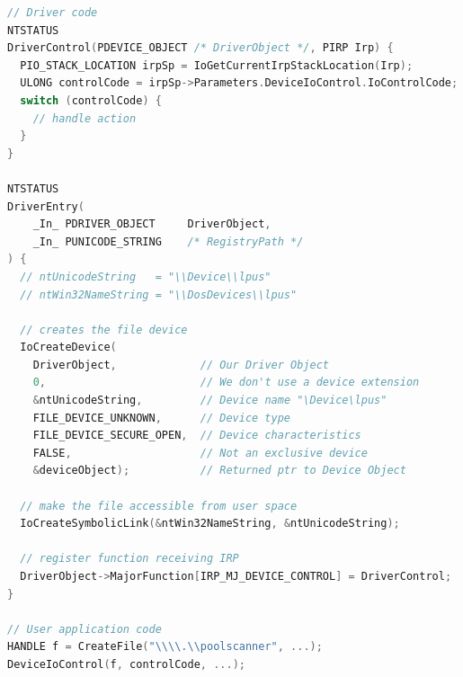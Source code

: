 \begin{lstlisting}[language=cpp,caption={Setup communication},label={lst:deviceio},float,floatplacement=H]
// Driver code
NTSTATUS
DriverControl(PDEVICE_OBJECT /* DriverObject */, PIRP Irp) {
  PIO_STACK_LOCATION irpSp = IoGetCurrentIrpStackLocation(Irp);
  ULONG controlCode = irpSp->Parameters.DeviceIoControl.IoControlCode;
  switch (controlCode) {
    // handle action
  }
}

NTSTATUS
DriverEntry(
    _In_ PDRIVER_OBJECT     DriverObject,
    _In_ PUNICODE_STRING    /* RegistryPath */
) {
  // ntUnicodeString   = "\\Device\\lpus"
  // ntWin32NameString = "\\DosDevices\\lpus"

  // creates the file device
  IoCreateDevice(
    DriverObject,             // Our Driver Object
    0,                        // We don't use a device extension
    &ntUnicodeString,         // Device name "\Device\lpus"
    FILE_DEVICE_UNKNOWN,      // Device type
    FILE_DEVICE_SECURE_OPEN,  // Device characteristics
    FALSE,                    // Not an exclusive device
    &deviceObject);           // Returned ptr to Device Object

  // make the file accessible from user space
  IoCreateSymbolicLink(&ntWin32NameString, &ntUnicodeString);

  // register function receiving IRP
  DriverObject->MajorFunction[IRP_MJ_DEVICE_CONTROL] = DriverControl;
}

// User application code
HANDLE f = CreateFile("\\\\.\\poolscanner", ...);
DeviceIoControl(f, controlCode, ...);
\end{lstlisting}

